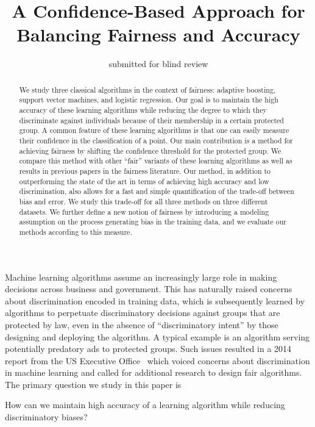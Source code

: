 \documentclass[conference]{IEEEtran}
\title{A Confidence-Based Approach for Balancing Fairness and Accuracy}
\author{submitted for blind review}
\begin{document}
\maketitle

\begin{abstract} 

We study three classical algorithms in the context of fairness: adaptive
boosting, support vector machines, and logistic regression.  Our goal is to
maintain the high accuracy of these learning algorithms while reducing the
degree to which they discriminate against individuals because of their
membership in a certain protected group.  A common feature of these learning
algorithms is that one can easily measure their confidence in the
classification of a point.  Our main contribution is a method for achieving
fairness by shifting the confidence threshold for the protected group.  We
compare this method with other ``fair'' variants of these learning algorithms
as well as results in previous papers in the fairness literature.  Our method,
in addition to outperforming the state of the art in terms of achieving high
accuracy and low discrimination, also allows for a fast and simple
quantification of the trade-off between bias and error.  We study this
trade-off for all three methods on three different datasets.  We further define
a new notion of fairness by introducing a modeling assumption on the process
generating bias in the training data, and we evaluate our methods according to
this measure. 

\end{abstract}

Machine learning algorithms assume an increasingly large role in making
decisions across business and government. This has naturally raised concerns
about discrimination encoded in training data, which is subsequently learned by
algorithms to perpetuate discriminatory decisions against groups that are
protected by law, even in the absence of ``discriminatory intent'' by those
designing and deploying the algorithm. A typical example is an algorithm
serving potentially predatory ads to protected groups. Such issues resulted in
a 2014 report from the US Executive Office~\cite{PodestaPMHZ14} which voiced
concerns about discrimination in machine learning and called for additional
research to design fair algorithms.  The primary question we study in this
paper is

\begin{center}
How can we maintain high accuracy of a learning algorithm while reducing
discriminatory biases?
\end{center}
\end{document}
